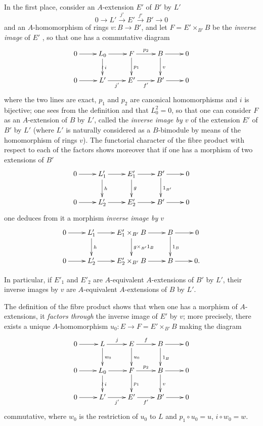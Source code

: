 \begin{env}[18.2.5]
\label{0.18.2.5}
In the first place, consider an $A$-extension $E'$ of $B'$ by $L'$
\[
  0\to L'\xrightarrow{j'} E'\xrightarrow{f'} B'\to 0
\]
and an $A$-homomorphism of rings $v:B\to B'$, and let $F=E'\times_{B'} B$ be the \emph{inverse image} of $E'$ , so that one has a commutative diagram
\[
  \xymatrix{
    0\ar[r] & L_0\ar[r]\ar[d]^{i}\ar@{}[d]|{\wr} & F\ar[r]^{p_2}\ar[d]^{p_1} & B\ar[r]\ar[d]^v & 0\\
    0\ar[r] & L'\ar[r]_{j'} & E'\ar[r]_{f'} & B'\ar[r] & 0
  }
\]
where the two lines are exact, $p_1$ and $p_2$ are canonical homomorphisms and $i$ is bijective; one sees from the definition  and  that $L_0^2=0$, so that one can consider $F$ as an $A$-extension of $B$ by $L'$, called the \emph{inverse image by $v$} of the extension $E'$ of $B'$ by $L'$ (where $L'$ is naturally considered as a $B$-bimodule by means of the homomorphism of rings $v$).
The functorial character
of the fibre product with respect to each of the factors shows moreover that if one has a morphism of two extensions of $B'$
\[
  \xymatrix{
    0\ar[r] & L'_1\ar[r]\ar[d]^h & E'_1\ar[r]\ar[d]^g & B'\ar[r]\ar[d]^{1_{B'}} & 0\\
    0\ar[r] & L'_2\ar[r] & E'_2\ar[r] & B'\ar[r] & 0
  }
\]
one deduces from it a morphism \emph{inverse image by $v$}
\[
  \xymatrix{
    0\ar[r] & L'_1\ar[r]\ar[d]^h & E'_1\times_{B'}B\ar[r]\ar[d]^{g\times_{B'}1_B} & B\ar[r]\ar[d]^{1_B} & 0\\
    0\ar[r] & L'_2\ar[r] & E'_2\times_{B'}B\ar[r] & B\ar[r] & 0.
  }
\]

In particular, if $E'_1$ and $E'_2$ are $A$-equivalent $A$-extensions of $B'$ by $L'$, their inverse images by $v$ are $A$-equivalent $A$-extensions of $B$ by $L'$.

The definition of the fibre product shows that when one has a morphism  of $A$-extensions, it \emph{factors through} the inverse image of $E'$ by $v$; more precisely, there exists a unique $A$-homomorphism $u_0:E\to F=E'\times_{B'}B$ making the diagram
\[
  \xymatrix{
    0\ar[r] & L\ar[r]^j\ar[d]^{w_0} & E\ar[r]^f\ar[d]^{u_0} & B\ar[r]\ar[d]^{1_B} & 0\\
    0\ar[r] & L_0\ar[r]\ar[d]^i\ar@{}[d]|{\wr} & F\ar[r]^{p_2}\ar[d]^{p_1} & B\ar[r]\ar[d]^v & 0\\
    0\ar[r] & L'\ar[r]_{j'} & E'\ar[r]_{f'} & B'\ar[r] & 0
  }
\]
commutative, where $w_0$ is the restriction of $u_0$ to $L$ and $p_1\circ u_0=u$, $i\circ w_0=w$.
\end{env}

